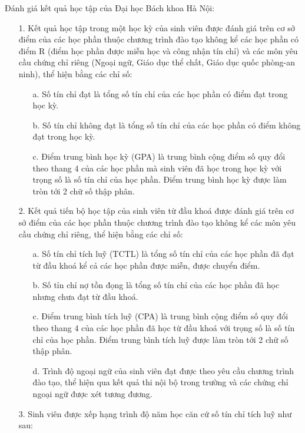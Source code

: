 \noindent Đánh giá kết quả học tập của Đại học Bách khoa Hà Nội:\textsuperscript{\cite{daotao}}
\begin{itemize}
	\item[1.] Kết quả học tập trong một học kỳ của sinh viên được đánh giá trên cơ sở điểm của các học phần thuộc chương trình đào tạo không kể các học phần có điểm R (điểm học phần được miễn học và công nhận tín chỉ) và các môn yêu cầu chứng chỉ riêng (Ngoại ngữ, Giáo dục thể chất, Giáo dục quốc phòng-an ninh), thể hiện bằng các chỉ số:
		\begin{itemize}
			\item[a.] Số tín chỉ đạt là tổng số tín chỉ của các học phần có điểm đạt trong học kỳ.
			\item[b.] Số tín chỉ không đạt là tổng số tín chỉ của các học phần có điểm không đạt trong học kỳ.
			\item[c.] Điểm trung bình học kỳ (GPA) là trung bình cộng điểm số quy đổi theo thang 4 của các học phần mà sinh viên đã học trong học kỳ với trọng số là số tín chỉ của học phần. Điểm trung bình học kỳ được làm tròn tới 2 chữ số thập phân.
		\end{itemize}
	\item[2.] Kết quả tiến bộ học tập của sinh viên từ đầu khoá được đánh giá trên cơ sở điểm của các học phần thuộc chương trình đào tạo không kể các môn yêu cầu chứng chỉ riêng, thể hiện bằng các chỉ số:
		\begin{itemize}
			\item[a.] Số tín chỉ tích luỹ (TCTL) là tổng số tín chỉ của các học phần đã đạt từ đầu khoá kể cả các học phần được miễn, được chuyển điểm.
			\item[b.] Số tỉn chỉ nợ tồn đọng là tổng số tín chỉ của các học phần đã học nhưng chưa đạt từ đầu khoá.
			\item[c.] Điểm trung bình tích luỹ (CPA) là trung bình cộng điểm số quy đổi theo thang 4 của các học phần đã học từ đầu khoá với trọng số là số tín chỉ của học phần. Điểm trung bình tích luỹ được làm tròn tới 2 chữ số thập phân.
			\item[d.] Trình độ ngoại ngữ của sinh viên đạt được theo yêu cầu chương trình đào tạo, thể hiện qua kết quả thi nội bộ trong trường và các chứng chỉ ngoại ngữ được xét tương đương.
		\end{itemize}
	\item[3.] Sinh viên được xếp hạng trình độ năm học căn cứ số tín chỉ tích luỹ như sau:
    \begin{table}[h!]
      \begin{tabular}{|l|c|c|c|c|c|}

\end{tabular}
\end{table}
\end{itemize}
